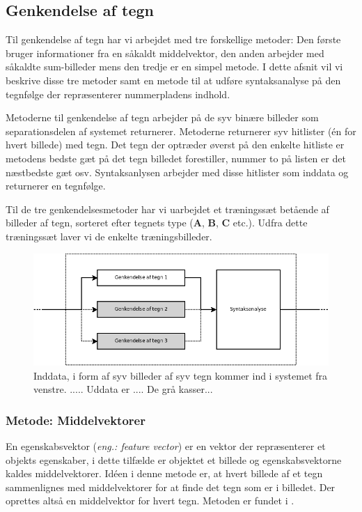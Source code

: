 \subsection{Genkendelse af tegn}

\label{sec_monster}
Til genkendelse af tegn har vi arbejdet med tre forskellige metoder: Den første bruger informationer fra en såkaldt middelvektor, den anden arbejder med såkaldte sum-billeder mens den tredje er en simpel metode. I dette afsnit vil vi beskrive disse tre metoder samt en metode til at udføre syntaksanalyse på den tegnfølge der repræsenterer nummerpladens indhold.

Metoderne til genkendelse af tegn arbejder på de syv binære billeder som separationsdelen af systemet returnerer. Metoderne returnerer syv hitlister (én for hvert billede) med tegn. Det tegn der optræder øverst på den enkelte hitliste er metodens bedste gæt på det tegn billedet forestiller, nummer to på listen er det næstbedste gæt osv. Syntaksanlysen arbejder med disse hitlister som inddata og returnerer en tegnfølge.

Til de tre genkendelsesmetoder har vi uarbejdet et træningssæt betående af billeder af tegn, sorteret efter tegnets type (\textbf{A}, \textbf{B}, \textbf{C} etc.). Udfra dette træningssæt laver vi de enkelte træningsbilleder.

\begin{figure}[htp]
\centering
\includegraphics[width=12cm]{system/illu/dia_trin3.png} 
\caption{Inddata, i form af syv billeder af syv tegn kommer ind i systemet fra venstre. ..... Uddata er .... De grå kasser...}
\label{fig:dia_trin3}
\end{figure}

\subsubsection{Metode: Middelvektorer}
En egenskabsvektor (\textit{eng.: feature vector}) er en vektor der repræsenterer et objekts egenskaber, i dette tilfælde er objektet et billede og egenskabsvektorne kaldes middelvektorer. Idéen i denne metode er, at hvert billede af et tegn sammenlignes med middelvektorer for at finde det tegn som er i billedet. Der oprettes altså en middelvektor for hvert tegn. Metoden er fundet i \cite{arth}.

